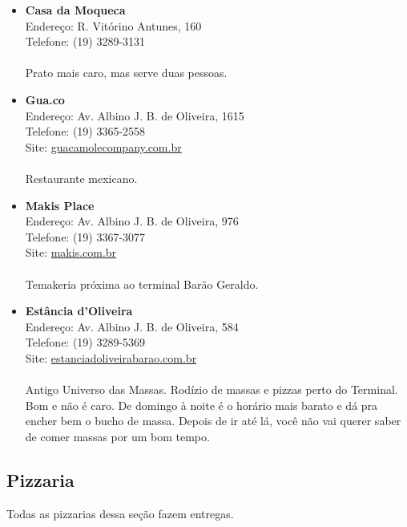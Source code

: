 \begin{itemize}
\item \textbf{Casa da Moqueca}
  \\Endereço: R. Vitórino Antunes, 160
  \\Telefone: (19) 3289-3131
  \\
  \\Prato mais caro, mas serve duas pessoas.

\item \textbf{Gua.co}
  \\Endereço: Av. Albino J. B. de Oliveira, 1615
  \\Telefone: (19) 3365-2558
  \\Site: \url{guacamolecompany.com.br}
  \\
  \\Restaurante mexicano.

\item \textbf{Makis Place}
  \\Endereço: Av. Albino J. B. de Oliveira, 976
  \\Telefone: (19) 3367-3077
  \\Site: \url{makis.com.br}
  \\
  \\Temakeria próxima ao terminal Barão Geraldo.

\item \textbf{Estância d'Oliveira}
  \\Endereço: Av. Albino J. B. de Oliveira, 584
  \\Telefone: (19) 3289-5369
  \\Site: \url{estanciadoliveirabarao.com.br}
  \\
  \\Antigo Universo das Massas. Rodízio de massas e pizzas perto do Terminal.
  Bom e não é caro. De domingo à noite é o horário mais barato e dá pra encher
  bem o bucho de massa. Depois de ir até lá, você não vai querer saber de comer
  massas por um bom tempo.
\end{itemize}

\subsection{Pizzaria}

Todas as pizzarias dessa seção fazem entregas.

